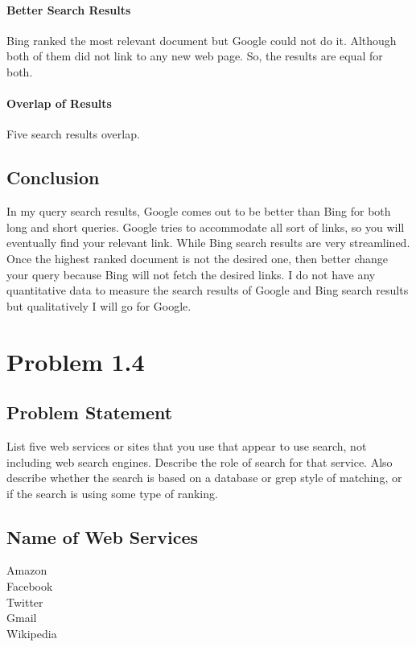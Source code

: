 \documentclass[12pt]{report}
\begin{document}
\subsubsection{Better Search Results}
Bing ranked the most relevant document but Google could not do it. Although both of them did not link to any new web page. So, the results are equal for both.  
\subsubsection{Overlap of Results}
Five search results overlap.

\section{Conclusion}
In my query search results, Google comes out to be better than Bing for both long and short queries. Google tries to accommodate all sort of links, so you will eventually find your relevant link. While Bing search results are very streamlined. Once the highest ranked document is not the desired one, then better change your query because Bing will not fetch the desired links. I do not have any quantitative data to measure the search results of Google and Bing search results but qualitatively I will go for Google. 

\chapter{Problem 1.4}
\section{Problem Statement}
List five web services or sites that you use that appear to use search, not including web search engines. Describe the role of search for that service. Also describe whether the search is based on a database or grep style of matching, or if the search is using some type of ranking.
\section{Name of Web Services}
Amazon\\
Facebook\\
Twitter\\
Gmail\\
Wikipedia
\end{document}
